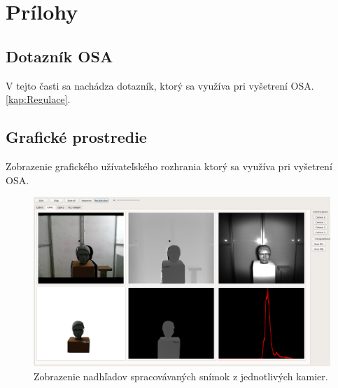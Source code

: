 \hidefromtoc

\renewcommand \thechapter{\roman{chapter}}
\renewcommand \thesection{\roman{chapter}.\roman{section}}
\renewcommand \thesubsection{\roman{chapter}.\roman{section}.\roman{subsection}}

\renewcommand{\thefigure}{\roman{chapter}.\roman{figure}}
\renewcommand{\thetable}{\roman{chapter}.\roman{table}}


\chapter{Prílohy}

\section{Dotazník OSA} \label{sec:Priloha:Dot}
V tejto časti sa nachádza dotazník, ktorý sa využíva pri vyšetrení OSA. \ref{kap:Regulace}.



\newpage
\section{Grafické prostredie} \label{sec:Priloha:HMI}
Zobrazenie grafického užívateľského rozhrania ktorý sa využíva pri vyšetrení OSA.

\begin{figure}[H]
	\centering
	\includegraphics[width=\textwidth]{figures/hmi.png}
	\caption{Zobrazenie nadhľadov spracovávaných snímok z jednotlivých kamier.}
	\label{fig:hmi:a}
\end{figure}

